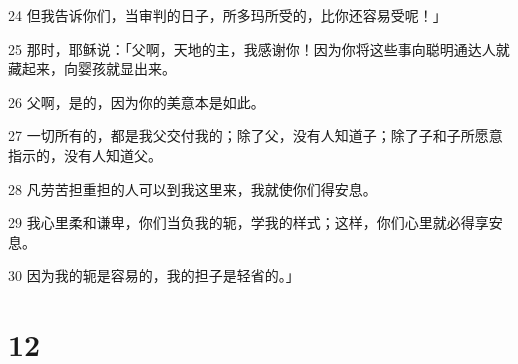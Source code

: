 \par 24 但我告诉你们，当审判的日子，所多玛所受的，比你还容易受呢！」
\par 25 那时，耶稣说：「父啊，天地的主，我感谢你！因为你将这些事向聪明通达人就藏起来，向婴孩就显出来。
\par 26 父啊，是的，因为你的美意本是如此。
\par 27 一切所有的，都是我父交付我的；除了父，没有人知道子；除了子和子所愿意指示的，没有人知道父。
\par 28 凡劳苦担重担的人可以到我这里来，我就使你们得安息。
\par 29 我心里柔和谦卑，你们当负我的轭，学我的样式；这样，你们心里就必得享安息。
\par 30 因为我的轭是容易的，我的担子是轻省的。」

\chapter{12}

